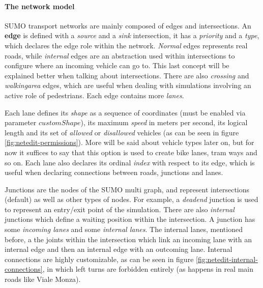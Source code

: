 \paragraph{The network model}

SUMO transport networks are mainly composed of edges and intersections. An \textbf{edge} is defined with a \textit{source} and a \textit{sink} intersection, it has a \textit{priority} and a \textit{type}, which declares the edge role within the network. \textit{Normal} edges represents real roads, while \textit{internal} edges are an abstraction used within intersections to configure where an incoming vehicle can go to. This last concept will be explained better when talking about intersections. There are also \textit{crossing} and \textit{walkingarea} edges, which are useful when dealing with simulations involving an active role of pedestrians. Each edge contains more \textit{lanes}.

Each lane defines its \textit{shape} as a sequence of coordinates (must be enabled via parameter $customShape$), its maximum \textit{speed} in meters per second, its logical length and its set of \textit{allowed} or \textit{disallowed} vehicles (as can be seen in figure \ref{fig:netedit-permissions}). More will be said about vehicle types later on, but for now it suffices to say that this option is used to create bike lanes, tram ways and so on. Each lane also declares its ordinal \textit{index} with respect to its edge, which is useful when declaring connections between roads, junctions and lanes.


Junctions are the nodes of the SUMO multi graph, and represent intersections (default) as well as other types of nodes. For example, a \textit{deadend} junction is used to represent an entry/exit point of the simulation. There are also \textit{internal} junctions which define a waiting position within the intersection. A junction has some \textit{incoming lanes} and some \textit{internal lanes}. The internal lanes, mentioned before, a the joints within the intersection which link an incoming lane with an internal edge and then an internal edge with an outcoming lane. Internal connections are highly customizable, as can be seen in figure \ref{fig:netedit-internal-connections}, in which left turns are forbidden entirely (as happens in real main roads like Viale Monza).

